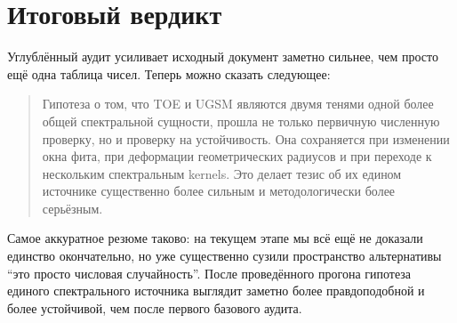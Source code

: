 \documentclass[12pt,a4paper]{article}
\begin{document}
\section{Итоговый вердикт}

Углублённый аудит усиливает исходный документ заметно сильнее, чем просто ещё одна таблица чисел. Теперь можно сказать следующее:

\begin{quote}
Гипотеза о том, что TOE и UGSM являются двумя тенями одной более общей спектральной сущности, прошла не только первичную численную проверку, но и проверку на устойчивость. Она сохраняется при изменении окна фита, при деформации геометрических радиусов и при переходе к нескольким спектральным kernels. Это делает тезис об их едином источнике существенно более сильным и методологически более серьёзным.
\end{quote}

Самое аккуратное резюме таково: на текущем этапе мы всё ещё не доказали единство окончательно, но уже существенно сузили пространство альтернативы ``это просто числовая случайность''. После проведённого прогона гипотеза единого спектрального источника выглядит заметно более правдоподобной и более устойчивой, чем после первого базового аудита.
\end{document}
